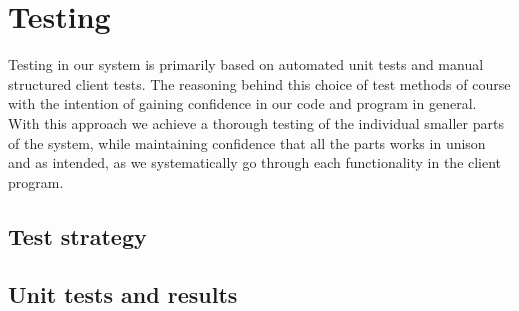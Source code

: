 \section{Testing}
Testing in our system is primarily based on automated unit tests and manual structured client tests. The reasoning behind this choice of test methods of course with the intention of gaining confidence in our code and program in general. With this approach we achieve a thorough testing of the individual smaller parts of the system, while maintaining confidence that all the parts works in unison and as intended, as we systematically go through each functionality in the client program.

\subsection{Test strategy}


\subsection{Unit tests and results}
